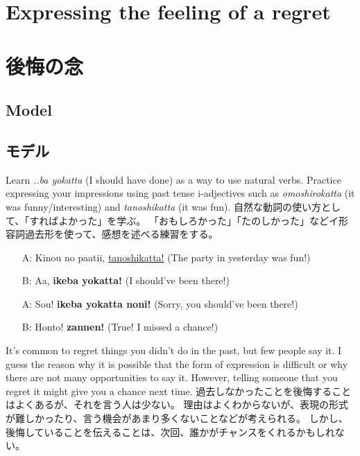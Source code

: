 \documentclass[uplatex,dvipdfmx,b5paper,english,10pt]{jsbook}
\begin{document}
%
%

\ifEnglish %
  \section{Expressing the feeling of a regret}
\else
  \section{後悔の念}
\fi

\ifEnglish
\subsection{Model}
\else
\subsection{モデル}
\fi

\begin{toiquestion}
\ifEnglish
Learn {\it ..ba yokatta\/} (I should have done) as a way to use natural verbs.
Practice expressing your impressions using past tense i-adjectives such as {\it omoshirokatta\/} (it was funny/interesting) and {\it tanoshikatta \/} (it was fun).
\else
自然な動詞の使い方として、「すればよかった」を学ぶ。
「おもしろかった」「たのしかった」などイ形容詞過去形を使って、感想を述べる練習をする。
\fi
\end{toiquestion}

\begin{itemize}
 \item[A:] Kinou no paatii, \underline{tanoshikatta!} (The party in yesterday was fun!)
 \item[B:] Aa, {\bfseries ikeba yokatta!} (I should've been there!)
 \item[A:] Sou! {\bfseries ikeba yokatta noni!} (Sorry, you should've been there!)
 \item[B:] Honto! {\bfseries zannen!} (True! I missed a chance!)
\end{itemize}

\begin{toianswer}
\ifEnglish
It's common to regret things you didn't do in the past, but few people say it.
I guess the reason why it is possible that the form of expression is difficult or why there are not many opportunities to say it.
However, telling someone that you regret it might give you a chance next time.
\else
過去しなかったことを後悔することはよくあるが、それを言う人は少ない。
理由はよくわからないが、表現の形式が難しかったり、言う機会があまり多くないことなどが考えられる。
しかし、後悔していることを伝えることは、次回、誰かがチャンスをくれるかもしれない。
\fi
\end{toianswer}
\end{document}
